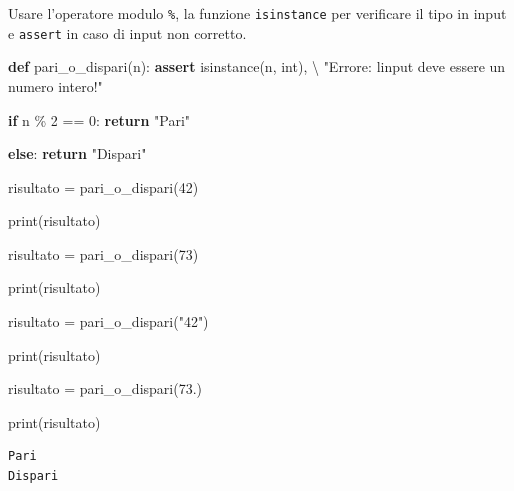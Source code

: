 \documentclass[
  letterpaper,
]{scrbook}
\newenvironment{Shaded}{\begin{snugshade}}{\end{snugshade}}
\newcommand{\BuiltInTok}[1]{\textcolor[rgb]{0.00,0.23,0.31}{#1}}
\newcommand{\CommentTok}[1]{\textcolor[rgb]{0.37,0.37,0.37}{#1}}
\newcommand{\ControlFlowTok}[1]{\textcolor[rgb]{0.00,0.23,0.31}{\textbf{#1}}}
\newcommand{\DecValTok}[1]{\textcolor[rgb]{0.68,0.00,0.00}{#1}}
\newcommand{\KeywordTok}[1]{\textcolor[rgb]{0.00,0.23,0.31}{\textbf{#1}}}
\newcommand{\NormalTok}[1]{\textcolor[rgb]{0.00,0.23,0.31}{#1}}
\newcommand{\OperatorTok}[1]{\textcolor[rgb]{0.37,0.37,0.37}{#1}}
\newcommand{\StringTok}[1]{\textcolor[rgb]{0.13,0.47,0.30}{#1}}
\begin{document}
\begin{tcolorbox}[enhanced jigsaw, leftrule=.75mm, arc=.35mm, opacityback=0, rightrule=.15mm, titlerule=0mm, colbacktitle=quarto-callout-tip-color!10!white, colback=white, colframe=quarto-callout-tip-color-frame, bottomrule=.15mm, toprule=.15mm, bottomtitle=1mm, toptitle=1mm, title=\textcolor{quarto-callout-tip-color}{\faLightbulb}\hspace{0.5em}{Suggerimento}, breakable, coltitle=black, opacitybacktitle=0.6, left=2mm]

Usare l'operatore modulo \texttt{\%}, la funzione \texttt{isinstance}
per verificare il tipo in input e \texttt{assert} in caso di input non
corretto.

\end{tcolorbox}

\begin{Shaded}
\begin{Highlighting}[]
\KeywordTok{def}\NormalTok{ pari\_o\_dispari(n):}
  \ControlFlowTok{assert} \BuiltInTok{isinstance}\NormalTok{(n, }\BuiltInTok{int}\NormalTok{), }\OperatorTok{\textbackslash{}}
    \StringTok{"Errore: l\textquotesingle{}input deve essere un numero intero!"}
    
  \ControlFlowTok{if}\NormalTok{ n }\OperatorTok{\%} \DecValTok{2} \OperatorTok{==} \DecValTok{0}\NormalTok{:}
    \ControlFlowTok{return} \StringTok{"Pari"}

  \ControlFlowTok{else}\NormalTok{:}
    \ControlFlowTok{return} \StringTok{"Dispari"}

\NormalTok{risultato }\OperatorTok{=}\NormalTok{ pari\_o\_dispari(}\DecValTok{42}\NormalTok{)}

\BuiltInTok{print}\NormalTok{(risultato)}

\NormalTok{risultato }\OperatorTok{=}\NormalTok{ pari\_o\_dispari(}\DecValTok{73}\NormalTok{)}

\BuiltInTok{print}\NormalTok{(risultato)}

\CommentTok{\textquotesingle{}\textquotesingle{}\textquotesingle{}}
\CommentTok{risultato = pari\_o\_dispari("42")}

\CommentTok{print(risultato)}

\CommentTok{risultato = pari\_o\_dispari(73.)}

\CommentTok{print(risultato)}
\CommentTok{\textquotesingle{}\textquotesingle{}\textquotesingle{}}
\end{Highlighting}
\end{Shaded}

\begin{verbatim}
Pari
Dispari
\end{verbatim}
\end{document}
